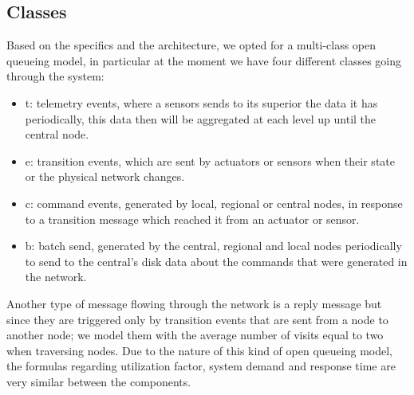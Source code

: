 \documentclass[11pt]{article}
\begin{document}
\subsection{Classes}
Based on the specifics and the architecture, we opted for a multi-class open queueing model, in particular at the moment we have four different classes going through the system:
\begin{itemize}
\item t: telemetry events, where a sensors sends to its superior the data it has periodically, this data then will be aggregated at each level up until the central node.
\item e: transition events, which are sent by actuators or sensors when their state or the physical network changes.
\item c: command events, generated by local, regional or central nodes, in response to a transition message which reached it from an actuator or sensor.
\item b: batch send, generated by the central, regional and local nodes periodically to send to the central's disk data about the commands that were generated in the network.
\end{itemize}
Another type of message flowing through the network is a reply message but since they are triggered only by transition events that are sent from a node to another node; we model them with the average number of visits equal to two when traversing nodes.
Due to the nature of this kind of open queueing model, the formulas regarding utilization factor, system demand and response time are very similar between the components.
\end{document}
